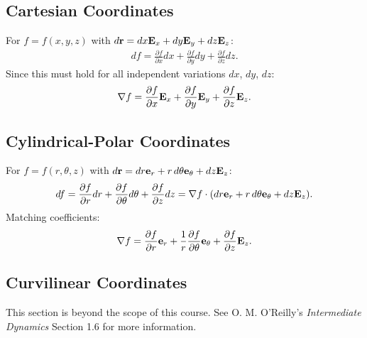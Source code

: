 \documentclass[
  letterpaper,
  DIV=11,
  numbers=noendperiod]{scrreprt}
\begin{document}
\subsection{Cartesian Coordinates}\label{cartesian-coordinates-1}

For \(f = f(x,y,z)\) with
\(d{\bf r} = dx{\bf E}_x+dy{\bf E}_y+dz{\bf E}_z\): \begin{align}
    df = \frac{\partial f}{\partial x}dx+\frac{\partial f}{\partial y}dy+\frac{\partial f}{\partial z}dz.
\end{align} Since this must hold for all independent variations \(dx\),
\(dy\), \(dz\): \begin{align}
    \nabla f = \frac{\partial f}{\partial x}{\bf E}_x+\frac{\partial f}{\partial y}{\bf E}_y+\frac{\partial f}{\partial z}{\bf E}_z.
\end{align}

\subsection{Cylindrical-Polar
Coordinates}\label{cylindrical-polar-coordinates-1}

For \(f = f(r,\theta,z)\) with
\(d{\bf r} = dr{\bf e}_r+r\,d\theta{\bf e}_\theta+dz{\bf E}_z\):
\begin{align}
    df = \frac{\partial f}{\partial r}dr+\frac{\partial f}{\partial \theta}d\theta+\frac{\partial f}{\partial z}dz = \nabla f\cdot(dr{\bf e}_r+r\,d\theta{\bf e}_\theta+dz{\bf E}_z).
\end{align} Matching coefficients: \begin{align}
    \nabla f = \frac{\partial f}{\partial r}{\bf e}_r+\frac{1}{r}\frac{\partial f}{\partial \theta}{\bf e}_\theta+\frac{\partial f}{\partial z}{\bf E}_z.
\end{align}

\subsection{Curvilinear Coordinates}\label{curvilinear-coordinates}

\begin{tcolorbox}[enhanced jigsaw, arc=.35mm, bottomrule=.15mm, bottomtitle=1mm, breakable, colback=white, colbacktitle=quarto-callout-note-color!10!white, colframe=quarto-callout-note-color-frame, coltitle=black, left=2mm, leftrule=.75mm, opacityback=0, opacitybacktitle=0.6, rightrule=.15mm, title=\textcolor{quarto-callout-note-color}{\faInfo}\hspace{0.5em}{Note}, titlerule=0mm, toprule=.15mm, toptitle=1mm]

This section is beyond the scope of this course. See O. M. O'Reilly's
\emph{Intermediate Dynamics} Section 1.6 for more information.

\end{tcolorbox}
\end{document}

